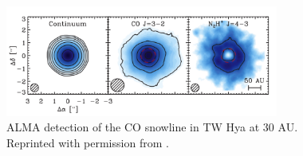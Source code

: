 
\begin{figure}[h]
\centering
\includegraphics[width=0.8\textwidth]{figures/CO.png}
\caption{ALMA detection of the CO snowline in TW Hya at 30 AU. Reprinted with permission from \citet{qi13}.}
\label{fig:qi13}
\end{figure}



